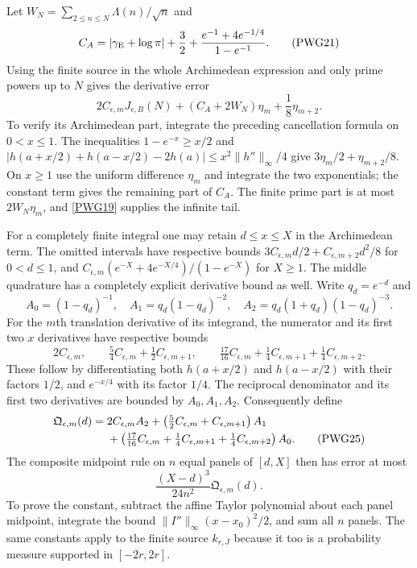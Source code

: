 \documentclass[11pt,a4paper]{article}
\theoremstyle{definition}\newtheorem{definition}[theorem]{Definition}
\begin{document}
Let $W_N=\sum_{2\le n\le N}\Lambda(n)/\sqrt n$ and
\begin{equation}
 C_A=|\gamma_{\rm E}+\log\pi|+\frac32+
                    \frac{e^{-1}+4e^{-1/4}}{1-e^{-1}}.
                                                               \tag{PWG21}\label{PWG21}
\end{equation}
Using the finite source in the whole Archimedean expression and only prime powers up to $N$ gives the derivative error
\begin{equation}
 \boxed{2C_{\epsilon,m}J_{\epsilon,B}(N)
       +(C_A+2W_N)\eta_m+\frac18\eta_{m+2}.}                 \tag{PWG22}\label{PWG22}
\end{equation}
To verify its Archimedean part, integrate the preceding cancellation formula on $0<x\le1$. The inequalities $1-e^{-x}\ge x/2$ and
$|h(a+x/2)+h(a-x/2)-2h(a)|\le x^2\|h''\|_\infty/4$
give $3\eta_m/2+\eta_{m+2}/8$. On $x\ge1$ use the uniform difference $\eta_m$ and integrate the two exponentials; the constant term gives the remaining part of $C_A$. The finite prime part is at most $2W_N\eta_m$, and \eqref{PWG19} supplies the infinite tail.

For a completely finite integral one may retain $d\le x\le X$ in the Archimedean term. The omitted intervals have respective bounds
$3C_{\epsilon,m}d/2+C_{\epsilon,m+2}d^2/8$ for $0<d\le1$, and
$C_{\epsilon,m}(e^{-X}+4e^{-X/4})/(1-e^{-X})$ for $X\ge1$.
The middle quadrature has a completely explicit derivative bound as well. Write $q_d=e^{-d}$ and
\[
 A_0=(1-q_d)^{-1},\quad A_1=q_d(1-q_d)^{-2},\quad
 A_2=q_d(1+q_d)(1-q_d)^{-3}.
\]
For the $m$th translation derivative of its integrand, the numerator and its first two $x$ derivatives have respective bounds
\[
 2C_{\epsilon,m},\qquad
 \tfrac54C_{\epsilon,m}+\tfrac12C_{\epsilon,m+1},\qquad
 \tfrac{17}{16}C_{\epsilon,m}+\tfrac14C_{\epsilon,m+1}
                          +\tfrac14C_{\epsilon,m+2}.
\]
These follow by differentiating both $h(a+x/2)$ and $h(a-x/2)$ with their factors $1/2$, and $e^{-x/4}$ with its factor $1/4$. The reciprocal denominator and its first two derivatives are bounded by $A_0,A_1,A_2$. Consequently define
\begin{align}
 \mathfrak Q_{\epsilon,m}(d)={}&2C_{\epsilon,m}A_2
 +\left(\tfrac52C_{\epsilon,m}+C_{\epsilon,m+1}\right)A_1\notag\\
 &+\left(\tfrac{17}{16}C_{\epsilon,m}
    +\tfrac14C_{\epsilon,m+1}+\tfrac14C_{\epsilon,m+2}\right)A_0.
                                                               \tag{PWG25}\label{PWG25}
\end{align}
The composite midpoint rule on $n$ equal panels of $[d,X]$ then has error at most
\begin{equation}
 \frac{(X-d)^3}{24n^2}\mathfrak Q_{\epsilon,m}(d).
                                                               \tag{PWG26}\label{PWG26}
\end{equation}
To prove the constant, subtract the affine Taylor polynomial about each panel midpoint, integrate the bound $\|I''\|_\infty(x-x_0)^2/2$, and sum all $n$ panels. The same constants apply to the finite source $k_{r,J}$ because it too is a probability measure supported in $[-2r,2r]$.
\end{document}
